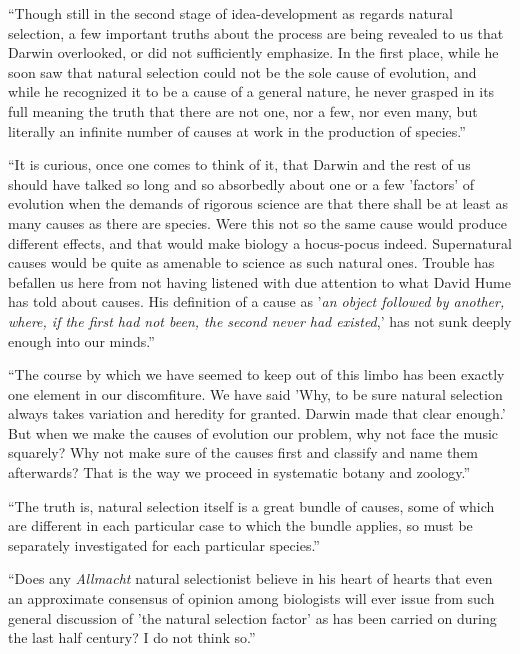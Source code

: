 \documentclass[a4paper, 11pt, oneside, polutonikogreek, english]{article}
\begin{document}
``Though still in the second stage of idea-development as regards natural selection, a few important truths about the process are being revealed to us that Darwin overlooked, or did not sufficiently emphasize. In the first place, while he soon saw that natural selection could not be the sole cause of evolution, and while he recognized it to be a cause of a general nature, he never grasped in its full meaning the truth that there are not one, nor a few, nor even many, but literally an infinite number of causes at work in the production of species.''

``It is curious, once one comes to think of it, that Darwin and the rest of us should have talked so long and so absorbedly about one or a few 'factors' of evolution when the demands of rigorous science are that there shall be at least as many causes as there are species. Were this not so the same cause would produce different effects, and that would make biology a hocus-pocus indeed. Supernatural causes would be quite as amenable to science as such natural ones. Trouble has befallen us here from not having listened with due attention to what David Hume has told about causes. His definition of a cause as '\emph{an object followed by another, where, if the first had not been, the second never had existed},' has not sunk deeply enough into our minds.''

``The course by which we have seemed to keep out of this limbo has been exactly one element in our discomfiture. We have said 'Why, to be sure natural selection always takes variation and heredity for granted. Darwin made that clear enough.' But when we make the causes of evolution our problem, why not face the music squarely? Why not make sure of the causes first and classify and name them afterwards? That is the way we proceed in systematic botany and zoology.''

``The truth is, natural selection itself is a great bundle of causes, some of which are different in each particular case to which the bundle applies, so must be separately investigated for each particular species.''

``Does any \emph{Allmacht} natural selectionist believe in his heart of hearts that even an approximate consensus of opinion among biologists will ever issue from such general discussion of 'the natural selection factor' as has been carried on during the last half century? I do not think so.''
\end{document}
